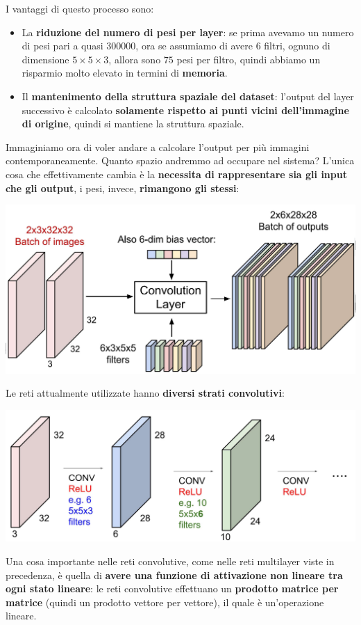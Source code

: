 \documentclass[12pt]{article}
\begin{document}
I vantaggi di questo processo sono:
\begin{itemize}
    \item La \textbf{riduzione del numero di pesi per layer}: se prima avevamo un numero di pesi pari a quasi 300000, ora se assumiamo di avere 6 filtri, ognuno di dimensione $5 \times 5 \times 3$, allora sono $75$ pesi per filtro, quindi  abbiamo un risparmio molto elevato in termini di \textbf{memoria}.
    \item Il \textbf{mantenimento della struttura spaziale del dataset}: l'output del layer successivo è calcolato \textbf{solamente rispetto ai punti vicini dell'immagine di origine}, quindi si mantiene la struttura spaziale.
\end{itemize}
Immaginiamo ora di voler andare a calcolare l'output per più immagini contemporaneamente. Quanto spazio andremmo ad occupare nel sistema?
L'unica cosa che effettivamente cambia è la \textbf{necessita di rappresentare sia gli input che gli output}, i pesi, invece, \textbf{rimangono gli stessi}:
\begin{center}
    \includegraphics[width =0.80\linewidth]{Images/150.PNG}
\end{center}
\newpage \noindent
Le reti attualmente utilizzate hanno \textbf{diversi strati convolutivi}:
\begin{center}
    \includegraphics[width =0.80\linewidth]{Images/151.PNG}
\end{center}
Una cosa importante nelle reti convolutive, come nelle reti multilayer viste in precedenza,
è quella di \textbf{avere una funzione di attivazione non lineare tra ogni stato lineare}: le reti convolutive effettuano un \textbf{prodotto matrice per matrice} (quindi un prodotto vettore per vettore), il quale è un'operazione lineare.
\end{document}
